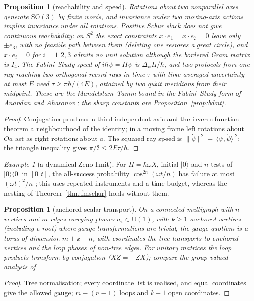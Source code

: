 \documentclass[aps,pra,onecolumn,superscriptaddress,nofootinbib,10pt]{revtex4-2}
\newtheorem{proposition}[theorem]{Proposition}
\theoremstyle{definition}
\theoremstyle{remark}
\newtheorem{example}[theorem]{Example}
\newcommand{\ip}[2]{\langle #1,#2\rangle}
\newcommand{\SO}{\mathrm{SO}}
\newcommand{\U}{\mathrm{U}}
\begin{document}
\begin{proposition}[reachability and speed]\label{prop:fmspeed}
Rotations about two nonparallel axes generate $\SO(3)$ by finite words, and invariance under two moving-axis
actions implies invariance under all rotations.  \emph{Positive Schur slack does not give continuous
reachability}: on $S^2$ the exact constraints $x\cdot e_1=x\cdot e_2=0$ leave only $\pm e_3$, with no feasible path between them
(deleting one restores a great circle), and $x\cdot e_i=0$ for $i=1,2,3$ admits no unit solution although the bordered
Gram matrix is $I_4$.  The Fubini--Study speed of $i\hbar\dot\psi=H\psi$ is $\Delta_\psi H/\hbar$, and two protocols from one ray reaching
two orthogonal record rays in time $\tau$ with time-averaged uncertainty at most $E$ need $\tau\ge\pi\hbar/(4E)$, attained by two qubit
meridians from their midpoint.  These are the Mandelstam--Tamm bound \cite{n4:MT} in the Fubini--Study form of
Anandan and Aharonov \cite{n4:AA}; the sharp constants are Proposition~\ref{prop:bdmt}.
\end{proposition}
\begin{proof}
Conjugation produces a third independent axis and the inverse function theorem a neighbourhood of
the identity; in a moving frame left rotations about $Oa$ act as right rotations about $a$.  The squared ray speed is
$\lVert\dot\psi\rVert^2-\lvert\ip\psi{\dot\psi}\rvert^2$; the triangle inequality gives $\pi/2\le2E\tau/\hbar$.
\end{proof}

\begin{example}[a dynamical Zeno limit]\label{ex:fmzeno}
For $H=\hbar\omega X$, initial $\lvert0\rangle$ and $n$ tests of $\lvert0\rangle\langle0\rvert$ in $[0,t]$, the all-success probability $\cos^{2n}(\omega t/n)$ has failure at most
$(\omega t)^2/n$ \cite{n3:Zeno}; this uses repeated instruments and a time budget, whereas the nesting of
Theorem~\ref{thm:fmschur} holds without them.
\end{example}

\begin{proposition}[anchored scalar transport]\label{prop:fmgraphphase}
On a connected multigraph with $n$ vertices and $m$ edges carrying phases $u_e\in\U(1)$, with $k\ge1$ anchored vertices
(including a root) where gauge transformations are trivial, the gauge quotient is a torus of dimension
$m+k-n$, with coordinates the tree transports to anchored vertices and the loop phases of non-tree edges.  For
unitary matrices the loop products transform by conjugation ($XZ=-ZX$); compare the group-valued
analysis of \cite[Sec.~0.4]{PaperI}.
\end{proposition}
\begin{proof}
Tree normalisation; every coordinate list is realised, and equal coordinates give the allowed gauge;
$m-(n-1)$ loops and $k-1$ open coordinates.
\end{proof}
\end{document}
